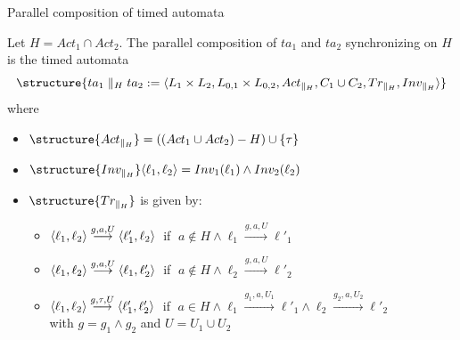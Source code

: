 \documentclass[aspectratio=169]{beamer}
\def\tran#1{\stackrel{#1}{\longrightarrow}}
\begin{document}
\begin{slide}{Parallel composition of timed automata}
\small

Let $H = Act_1 \cap Act_2$. The parallel composition of $ta_1$ and  $ta_2$ synchronizing on $H$
is the timed automata
\begin{equation*}
\structure{ta_1 \parallel_H ta_2 := \pair{L_1 \times L_2, L_{0,1} \times L_{0,2}, Act_{\parallel_H}, C_1 \cup C_2, Tr_{\parallel_H}, Inv_{\parallel_H}}}
\end{equation*}
where
\begin{itemize}
\item $\structure{Act_{\parallel_H}} = ((Act_1 \cup Act_2) - H) \cup \set{\tau}$
\item $\structure{Inv_{\parallel_H}} \pair{\ell_1,\ell_2} = Inv_1(\ell_1) \land  Inv_2(\ell_2)$
\item $\structure{Tr_{\parallel_H}}$ is given by:
\begin{itemize}
\item $\pair{\ell_1,\ell_2} \tran{g,a,U} \pair{\ell'_1,\ell_2}\; $ if $\; a \not \in H \land  \ell_1 \tran{g,a,U} \ell'_1 $
\item $\pair{\ell_1,\ell_2} \tran{g,a,U} \pair{\ell_1,\ell'_2}\; $ if $\; a \not \in H \land   \ell_2 \tran{g,a,U} \ell'_2$
\item $\pair{\ell_1,\ell_2} \tran{g,\tau,U} \pair{\ell'_1,\ell'_2}\; $ if $\; a \in H \land  \ell_1 \tran{g_1,a,U_1} \ell'_1 \land \ell_2 \tran{g_2,a,U_2} \ell'_2$\\
with $g = g_1 \land g_2$ and $U = U_1 \cup U_2$
\end{itemize}
\end{itemize}
\end{slide}
\end{document}
